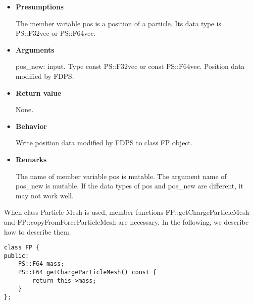\begin{itemize}

\item {\bf Presumptions}

  The member variable pos is a position of a particle. Its data type
  is PS::F32vec or PS::F64vec.

\item {\bf Arguments}

  pos\_new: input. Type const PS::F32vec or const PS::F64vec. Position
  data modified by FDPS.

\item {\bf Return value}

  None.
  
\item {\bf Behavior}

  Write position data modified by FDPS to class FP object.

\item {\bf Remarks}

  The name of member variable pos is mutable. The argument name of
  pos\_new is mutable. If the data types of pos and pos\_new are
  different, it may not work well.

\end{itemize}


When class Particle Mesh is used, member functions
FP::getChargeParticleMesh and FP::copyFromForceParticleMesh are
necessary. In the following, we describe how to describe them.


\begin{screen}
\begin{verbatim}
class FP {
public:
    PS::F64 mass;
    PS::F64 getChargeParticleMesh() const {
        return this->mass;
    }
};
\end{verbatim}
\end{screen}

